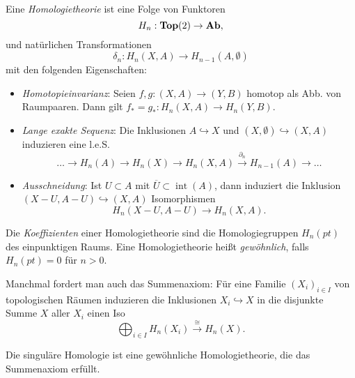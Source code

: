 \documentclass{cheat-sheet}
\DeclareMathOperator{\inte}{int} %
\newcommand{\clos}[1]{\overline{#1}} %
\begin{document}



\begin{defn}\mbox{}\\
  Eine \emph{Homologietheorie} ist eine Folge von Funktoren
  \[ H_n : \mathbf{Top}(2) \to \mathbf{Ab}, \]
  und natürlichen Transformationen
  \[ \delta_n : H_n(X, A) \to H_{n-1}(A, \emptyset) \]
  mit den folgenden Eigenschaften:
  \begin{itemize}
    \item \emph{Homotopieinvarianz}: Seien $f, g : (X, A) \to (Y, B)$ homotop als Abb. von Raumpaaren. Dann gilt $f_* \!=\! g_* : H_n(X, A) \to H_n(Y, B)$.
    \item \emph{Lange exakte Sequenz}: Die Inklusionen $A \hookrightarrow X$ und $(X, \emptyset) \hookrightarrow (X, A)$ induzieren eine l.e.S.
    \[ \ldots \to H_n(A) \to H_n(X) \to H_n(X, A) \xrightarrow{\partial_n} H_{n-1}(A) \to \ldots \]
    \item \emph{Ausschneidung}: Ist $U \subset A$ mit $\clos{U} \subset \inte(A)$, dann induziert die Inklusion $(X - U, A - U) \hookrightarrow (X, A)$ Isomorphismen
    \[ H_n(X-U, A-U) \to H_n(X,A). \]
  \end{itemize}
\end{defn}

\begin{defn}
  Die \emph{Koeffizienten} einer Homologietheorie sind die Homologiegruppen $H_n(pt)$ des einpunktigen Raums.
  Eine Homologietheorie heißt \emph{gewöhnlich}, falls $H_n(pt) = 0$ für $n > 0$.
\end{defn}

\begin{bem}
  Manchmal fordert man auch das Summenaxiom: Für eine Familie $(X_i)_{i \in I}$ von topologischen Räumen induzieren die Inklusionen $X_i \hookrightarrow X$ in die disjunkte Summe $X$ aller $X_i$ einen Iso
  \[ \bigoplus_{i \in I} H_n(X_i) \xrightarrow{\cong} H_n(X). \]
\end{bem}

\begin{bem}
  Die singuläre Homologie ist eine gewöhnliche Homologietheorie, die das Summenaxiom erfüllt.
\end{bem}

\end{document}
